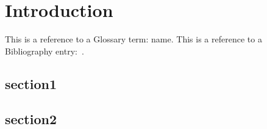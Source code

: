 \chapter{Introduction}

This is a reference to a Glossary term: \gls{name}.
This is a reference to a Bibliography entry:~\cite{label}.
\section{section1}

\lipsum[1-3]{}



\section{section2}

\lipsum[1-3]{}

